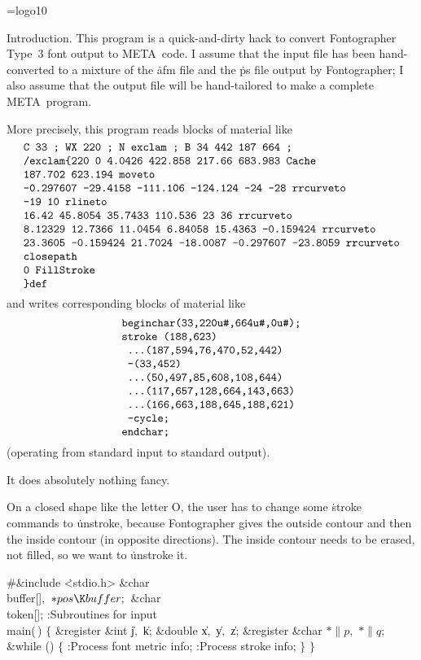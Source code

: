 
\hypertextrue\srcloctrue
\datethis
\font\logo=logo10
\def\MF{{\logo META}\-{\logo FONT}}


Introduction. This program is a quick-and-dirty hack to
convert
Fontographer Type~3 font output to \MF\ code. I assume that the input
file has been hand-converted to a mixture of the \.{afm} file and
the \.{ps} file output by Fontographer; I also assume that the output
file will be hand-tailored to make a complete \MF\ program.

More precisely, this program reads blocks of material like
$$\vbox{\halign{\tt#\cr
C 33 ; WX 220 ; N exclam ; B 34 442 187 664 ;\cr
/exclam\char`\{220 0 4.0426 422.858 217.66 683.983 Cache\cr
187.702 623.194 moveto\cr
-0.297607 -29.4158 -111.106 -124.124 -24 -28 rrcurveto\cr
-19 10 rlineto\cr
16.42 45.8054 35.7433 110.536 23 36 rrcurveto\cr
8.12329 12.7366 11.0454 6.84058 15.4363 -0.159424 rrcurveto\cr
23.3605 -0.159424 21.7024 -18.0087 -0.297607 -23.8059 rrcurveto\cr
closepath\cr
0 FillStroke\cr
\char`\}def\cr
}}$$
and writes corresponding blocks of material like
$$\vbox{\halign{\tt#\cr
beginchar(33,220u\char`#,664u\char`#,0u\char`#);\cr
stroke (188,623)\cr
\ ...(187,594,76,470,52,442)\cr
\ --(33,452)\cr
\ ...(50,497,85,608,108,644)\cr
\ ...(117,657,128,664,143,663)\cr
\ ...(166,663,188,645,188,621)\cr
\ --cycle;\cr
endchar;\cr
}}$$
(operating from standard input to standard output).

It does absolutely nothing fancy.

On a closed shape like the letter O, the user has to change some \.{stroke}
commands to \.{unstroke}, because Fontographer gives the outside contour and
then the inside contour (in opposite directions). The inside contour needs
to be erased, not filled, so we want to \.{unstroke} it.

\Y\B\8\#\&{include} \.{<stdio.h>}\6
\&{char} \\{buffer}[]${},{}$ ${}{*}\\{pos}\K\\{buffer};{}$\6
\&{char} \\{token}[];\7
:Subroutines for input\X\7
\\{main}(\,)\1\1\2\2\6
${}\{{}$\1\6
\&{register} \&{int} \|j${},{}$ \|k;\6
\&{double} \|x${},{}$ \|y${},{}$ \|z;\6
\&{register} \&{char} ${}{*}\|p,{}$ ${}{*}\|q;{}$\7
\&{while} ()\5
${}\{{}$\1\6
:Process font metric info\X;\6
:Process stroke info\X;\6
\4${}\}{}$\2\6
\4${}\}{}$\2\par
\fi


